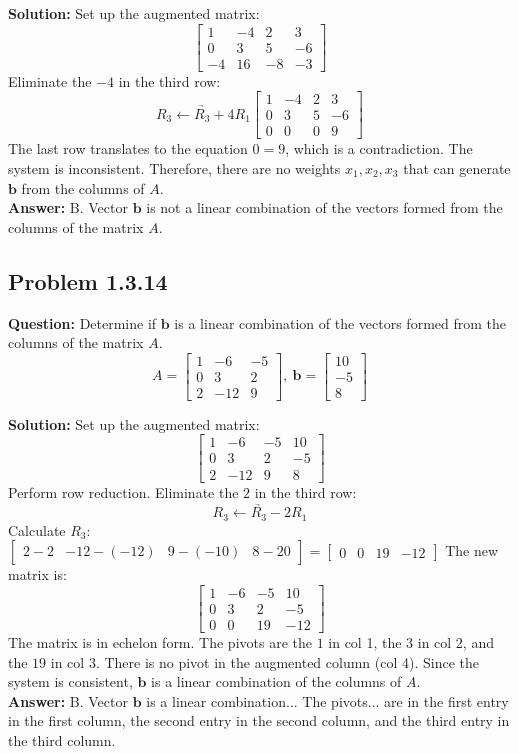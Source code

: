 \documentclass[11pt]{article}
\begin{document}
\textbf{Solution:}
Set up the augmented matrix:
\[ \begin{bmatrix} 1 & -4 & 2 & 3 \\ 0 & 3 & 5 & -6 \\ -4 & 16 & -8 & -3 \end{bmatrix} \]
Eliminate the $-4$ in the third row:
\[ \underrightarrow{R_3 \leftarrow R_3 + 4R_1} \begin{bmatrix} 1 & -4 & 2 & 3 \\ 0 & 3 & 5 & -6 \\ 0 & 0 & 0 & 9 \end{bmatrix} \]
The last row translates to the equation $0 = 9$, which is a contradiction. The system is inconsistent. Therefore, there are no weights $x_1, x_2, x_3$ that can generate $\mathbf{b}$ from the columns of $A$.
\\
\textbf{Answer:} B. Vector $\mathbf{b}$ is not a linear combination of the vectors formed from the columns of the matrix $A$.


\subsection*{Problem 1.3.14}
\textbf{Question:} Determine if $\mathbf{b}$ is a linear combination of the vectors formed from the columns of the matrix $A$.
\[ A = \begin{bmatrix} 1 & -6 & -5 \\ 0 & 3 & 2 \\ 2 & -12 & 9 \end{bmatrix}, \ \mathbf{b} = \begin{bmatrix} 10 \\ -5 \\ 8 \end{bmatrix} \]

\textbf{Solution:}
Set up the augmented matrix:
\[ \begin{bmatrix} 1 & -6 & -5 & 10 \\ 0 & 3 & 2 & -5 \\ 2 & -12 & 9 & 8 \end{bmatrix} \]
Perform row reduction. Eliminate the $2$ in the third row:
\[ \underrightarrow{R_3 \leftarrow R_3 - 2R_1} \]
Calculate $R_3$: $\begin{bmatrix} 2-2 & -12-(-12) & 9-(-10) & 8-20 \end{bmatrix} = \begin{bmatrix} 0 & 0 & 19 & -12 \end{bmatrix}$
The new matrix is:
\[ \begin{bmatrix} 1 & -6 & -5 & 10 \\ 0 & 3 & 2 & -5 \\ 0 & 0 & 19 & -12 \end{bmatrix} \]
The matrix is in echelon form. The pivots are the $1$ in col 1, the $3$ in col 2, and the $19$ in col 3. There is no pivot in the augmented column (col 4). Since the system is consistent, $\mathbf{b}$ is a linear combination of the columns of $A$.
\\
\textbf{Answer:} B. Vector $\mathbf{b}$ is a linear combination... The pivots... are in the first entry in the first column, the second entry in the second column, and the third entry in the third column.
\end{document}

